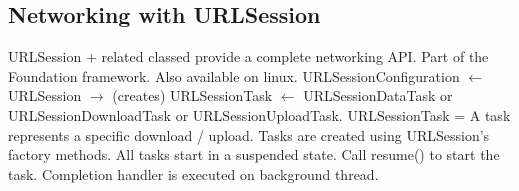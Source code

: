 \subsection{Networking with URLSession}
URLSession + related classed provide a complete networking API. Part of the Foundation framework. Also available on linux.
URLSessionConfiguration $\leftarrow$ URLSession $\rightarrow$ (creates) URLSessionTask $\leftarrow$ URLSessionDataTask or URLSessionDownloadTask or URLSessionUploadTask. URLSessionTask = A task represents a specific download / upload. Tasks are created using URLSession's factory methods. All tasks start in a suspended state. Call resume() to start the task. Completion handler is executed on background thread.
